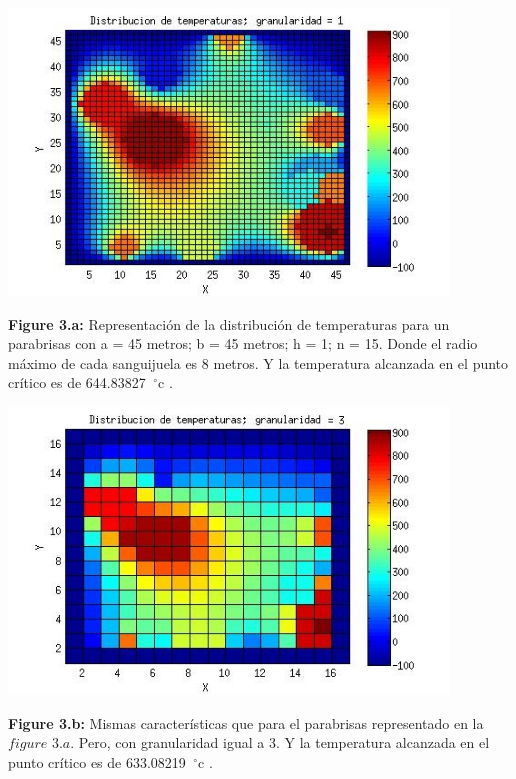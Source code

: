 \documentclass[a4paper]{article}
\begin{document}
\includegraphics[width=\textwidth,height=3.0in,keepaspectratio
]{r7h1.jpg} \newline
\begin {flushleft}
\textbf{Figure 3.a:} Representación de la distribución de temperaturas para un parabrisas con a = 45 metros; b = 45 metros; h = 1; n = 15. Donde el radio máximo de cada sanguijuela es 8 metros. Y la temperatura alcanzada en el punto crítico es de 644.83827\hspace{-1.5mm}$\phantom{a}^{\circ}$c .
\end{flushleft}

\includegraphics[width=\textwidth,height=3.0in,keepaspectratio
]{r7h3.jpg} \newline
\begin {flushleft}
\textbf{Figure 3.b:} Mismas características que para el parabrisas representado en la $figure$ $3.a$. Pero, con granularidad igual a 3. Y la temperatura alcanzada en el punto crítico es de 633.08219\hspace{-1.5mm}$\phantom{a}^{\circ}$c .
\end{flushleft}
\end{document}
